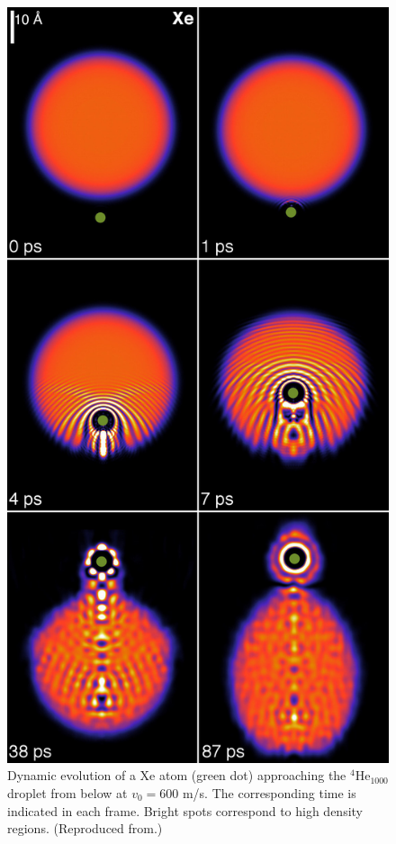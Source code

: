 \begin{figure}[!]
\centerline{\includegraphics[width=0.6\linewidth,clip]{fig1-Xe-600mps}}
\caption{\label{fig1-capture} 
Dynamic evolution of a Xe atom (green dot) approaching the $^4$He$_{1000}$ 
droplet from below at $v_0 = 600$ m/s. The corresponding time is indicated in each frame. 
Bright spots correspond to high density regions. (Reproduced from.)
}
\end{figure}
%

